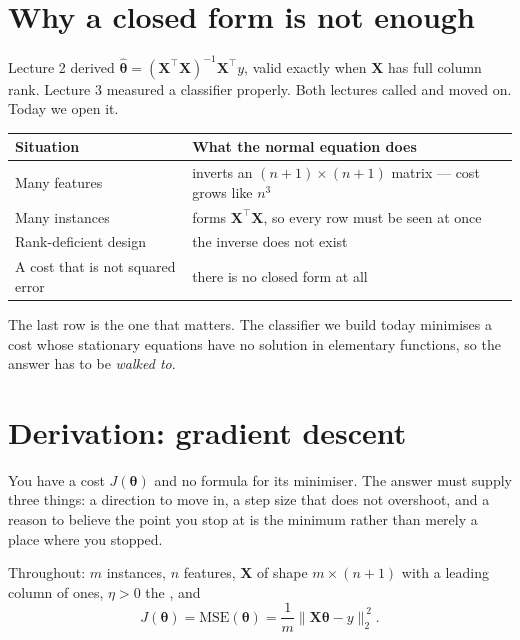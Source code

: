 \documentclass[11pt,a4paper]{article}
\begin{document}

\section{Why a closed form is not enough}

Lecture 2 derived $\hat{\boldsymbol\theta} =
(\mathbf{X}^{\intercal}\mathbf{X})^{-1}\mathbf{X}^{\intercal}y$, valid exactly
when $\mathbf{X}$ has full column rank. Lecture 3 measured a classifier
properly. Both lectures called  and moved on. Today we open it.

\begin{center}
\small
\begin{tabular}{p{}p{}}
\toprule
\textbf{Situation} & \textbf{What the normal equation does} \\
\midrule
Many features    & inverts an $(n{+}1)\times(n{+}1)$ matrix --- cost grows like
                   $n^{3}$ \\
Many instances   & forms $\mathbf{X}^{\intercal}\mathbf{X}$, so every row must
                   be seen at once \\
Rank-deficient design & the inverse does not exist \\
A cost that is not squared error & there is no closed form at all \\
\bottomrule
\end{tabular}
\end{center}

The last row is the one that matters. The classifier we build today minimises a
cost whose stationary equations have no solution in elementary functions, so
the answer has to be \emph{walked to}.

\section{Derivation: gradient descent}

You have a cost $J(\boldsymbol\theta)$ and no formula for its minimiser. The
answer must supply three things: a direction to move in, a step size that does
not overshoot, and a reason to believe the point you stop at is the minimum
rather than merely a place where you stopped.

Throughout: $m$ instances, $n$ features, $\mathbf{X}$ of shape
$m \times (n{+}1)$ with a leading column of ones, $\eta > 0$ the
, and
\[ J(\boldsymbol\theta) = \mathrm{MSE}(\boldsymbol\theta)
   = \frac{1}{m}\lVert \mathbf{X}\boldsymbol\theta - y\rVert_2^{\,2}. \]
\end{document}
